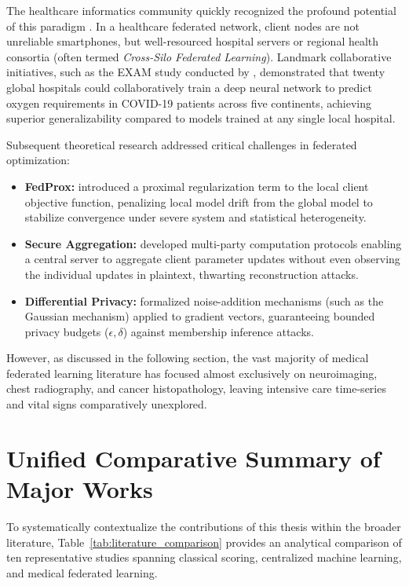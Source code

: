 The healthcare informatics community quickly recognized the profound potential of this paradigm \citep{rieke2020future, kaissis2020secure}. In a healthcare federated network, client nodes are not unreliable smartphones, but well-resourced hospital servers or regional health consortia (often termed \textit{Cross-Silo Federated Learning}). Landmark collaborative initiatives, such as the EXAM study conducted by \citet{dayan2021federated}, demonstrated that twenty global hospitals could collaboratively train a deep neural network to predict oxygen requirements in COVID-19 patients across five continents, achieving superior generalizability compared to models trained at any single local hospital.

Subsequent theoretical research addressed critical challenges in federated optimization:
\begin{itemize}
    \item \textbf{FedProx:} \citet{li2020federated} introduced a proximal regularization term to the local client objective function, penalizing local model drift from the global model to stabilize convergence under severe system and statistical heterogeneity.
    \item \textbf{Secure Aggregation:} \citet{bonawitz2017practical} developed multi-party computation protocols enabling a central server to aggregate client parameter updates without even observing the individual updates in plaintext, thwarting reconstruction attacks.
    \item \textbf{Differential Privacy:} \citet{dwork2014algorithmic} formalized noise-addition mechanisms (such as the Gaussian mechanism) applied to gradient vectors, guaranteeing bounded privacy budgets ($\epsilon, \delta$) against membership inference attacks.
\end{itemize}

However, as discussed in the following section, the vast majority of medical federated learning literature has focused almost exclusively on neuroimaging, chest radiography, and cancer histopathology, leaving intensive care time-series and vital signs comparatively unexplored.

\section{Unified Comparative Summary of Major Works}
\label{sec:comparative_summary}

To systematically contextualize the contributions of this thesis within the broader literature, Table~\ref{tab:literature_comparison} provides an analytical comparison of ten representative studies spanning classical scoring, centralized machine learning, and medical federated learning.

